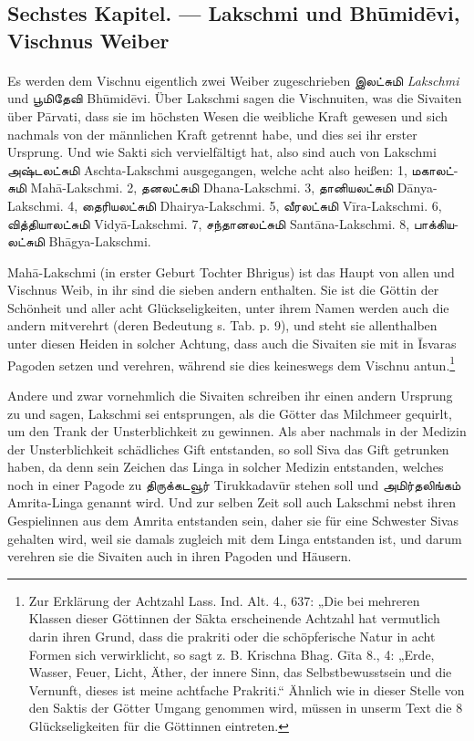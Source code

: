 \documentclass{article}
\newcommand{\TamilText}[1]{\texttamil{#1}}
\newcommand{\tam}[1]{\TamilText{#1}}
\begin{document}
\clearpage
\subsection{Sechstes Kapitel. — Lakschmi und Bh\={u}mid\={e}vi, Vischnus Weiber}
\paragraph{}
Es werden dem Vischnu eigentlich zwei Weiber zugeschrieben \tam{இலட்சுமி} \emph{Lakschmi} und \tam{பூமிதேவி} Bh\={u}mid\={e}vi. Über Lakschmi sagen die Vischnuiten, was die Sivaiten über P\={a}rvati, dass sie im höchsten Wesen die weibliche Kraft gewesen und sich nachmals von der männlichen Kraft getrennt habe, und dies sei ihr erster Ursprung. Und wie Sakti sich vervielfältigt hat, also sind auch von Lakschmi \tam{அஷ்டலட்சுமி} Aschta-Lakschmi ausgegangen, welche acht also heißen: 1, \tam{மகாலட்சுமி} Mah\={a}-Lakschmi. 2, \tam{தனலட்சுமி} Dhana-Lakschmi. 3, \tam{தானியலட்சுமி} D\={a}nya-Lakschmi. 4, \tam{தைரியலட்சுமி} Dhairya-Lakschmi. 5, \tam{வீரலட்சுமி} V\={i}ra-Lakschmi. 6, \tam{வித்தியாலட்சுமி} Vidy\={a}-Lakschmi. 7, \tam{சந்தானலட்சுமி} Sant\={a}na-Lakschmi. 8, \tam{பாக்கியலட்சுமி} Bh\={a}gya-Lakschmi.

Mah\={a}-Lakschmi (in erster Geburt Tochter Bhrigus) ist das Haupt von allen und Vischnus Weib, in ihr sind die sieben andern enthalten. Sie ist die Göttin der Schönheit und aller acht Glückseligkeiten, unter ihrem Namen werden auch die andern mitverehrt (deren Bedeutung s. Tab. p. 9), und steht sie allenthalben unter diesen Heiden in solcher Achtung, dass auch die Sivaiten sie mit in \={I}svaras Pagoden setzen und verehren, während sie dies keineswegs dem Vischnu antun.\footnote{Zur Erklärung der Achtzahl Lass. Ind. Alt. 4., 637: „Die bei mehreren Klassen dieser Göttinnen der S\={a}kta erscheinende Achtzahl hat vermutlich darin ihren Grund, dass die prakriti oder die schöpferische Natur in acht Formen sich verwirklicht, so sagt z. B. Krischna Bhag. G\={i}ta 8., 4: „Erde, Wasser, Feuer, Licht, Äther, der innere Sinn, das Selbstbewusstsein und die Vernunft, dieses ist meine achtfache Prakriti.“ Ähnlich wie in dieser Stelle von den Saktis der Götter Umgang genommen wird, müssen in unserm Text die 8 Glückseligkeiten für die Göttinnen eintreten.}

Andere und zwar vornehmlich die Sivaiten schreiben ihr einen andern Ursprung zu und sagen, Lakschmi sei entsprungen, als die Götter das Milchmeer gequirlt, um den Trank der Unsterblichkeit zu gewinnen. Als aber nachmals in der Medizin der Unsterblichkeit schädliches Gift entstanden, so soll Siva das Gift getrunken haben, da denn sein Zeichen das Linga in solcher Medizin entstanden, welches noch in einer Pagode zu \tam{திருக்கடவூர்} Tirukkadav\={u}r stehen soll und \tam{அமிர்தலிங்கம்} Amrita-Linga genannt wird. Und zur selben Zeit soll auch Lakschmi nebst ihren Gespielinnen aus dem Amrita entstanden sein, daher sie für eine Schwester Sivas gehalten wird, weil sie damals zugleich mit dem Linga entstanden ist, und darum verehren sie die Sivaiten auch in ihren Pagoden und Häusern.
\end{document}
